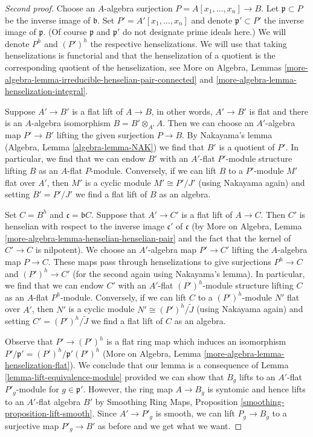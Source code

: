 \begin{proof}[Second proof]
Choose an $A$-algebra surjection $P = A[x_1, \ldots, x_n] \to B$.
Let $\mathfrak p \subset P$ be the inverse image of $\mathfrak b$.
Set $P' = A'[x_1, \ldots, x_n]$ and denote $\mathfrak p' \subset P'$
the inverse image of $\mathfrak p$. (Of course $\mathfrak p$
and $\mathfrak p'$ do not designate prime ideals here.)
We will denote $P^h$ and $(P')^h$ the respective henselizations.
We will use that taking henselizations is functorial and that
the henselization of a quotient is the corresponding quotient
of the henselization, see
More on Algebra, Lemmas
\ref{more-algebra-lemma-irreducible-henselian-pair-connected} and
\ref{more-algebra-lemma-henselization-integral}.

\medskip\noindent
Suppose $A' \to B'$ is a flat lift of $A \to B$, in other words,
$A' \to B'$ is flat and there is an $A$-algebra isomorphism
$B = B' \otimes_{A'} A$. Then we can choose an $A'$-algebra map
$P' \to B'$ lifting the given surjection $P \to B$.
By Nakayama's lemma (Algebra, Lemma \ref{algebra-lemma-NAK})
we find that $B'$ is a quotient of $P'$. In particular, we find
that we can endow $B'$ with an $A'$-flat $P'$-module structure
lifting $B$ as an $A$-flat $P$-module.
Conversely, if we can lift $B$ to a $P'$-module $M'$ flat over $A'$,
then $M'$ is a cyclic module $M' \cong P'/J'$ (using Nakayama again)
and setting $B' = P'/J'$ we find a flat lift of $B$ as an algebra.

\medskip\noindent
Set $C = B^h$ and $\mathfrak c = \mathfrak bC$.
Suppose that $A' \to C'$ is a flat lift of $A \to C$.
Then $C'$ is henselian with respect to the inverse image
$\mathfrak c'$ of $\mathfrak c$
(by More on Algebra, Lemma \ref{more-algebra-lemma-henselian-henselian-pair}
and the fact that the kernel of $C' \to C$ is nilpotent).
We choose an $A'$-algebra map $P' \to C'$ lifting
the $A$-algebra map $P \to C$. These maps pass through
henselizations to give surjections $P^h \to C$ and $(P')^h \to C'$
(for the second again using Nakayama's lemma).
In particular, we find that we can endow $C'$ with an $A'$-flat
$(P')^h$-module structure lifting $C$ as an $A$-flat $P^h$-module.
Conversely, if we can lift $C$ to a $(P')^h$-module $N'$ flat over $A'$,
then $N'$ is a cyclic module $N' \cong (P')^h/\tilde J$
(using Nakayama again) and setting $C' = (P')^h/\tilde J$
we find a flat lift of $C$ as an algebra.

\medskip\noindent
Observe that $P' \to (P')^h$ is a flat ring map which
induces an isomorphism $P'/\mathfrak p' = (P')^h/\mathfrak p'(P')^h$
(More on Algebra, Lemma \ref{more-algebra-lemma-henselization-flat}).
We conclude that our lemma is a consequence of
Lemma \ref{lemma-lift-equivalence-module} provided we can
show that $B_g$ lifts to an $A'$-flat $P'_g$-module for
$g \in \mathfrak p'$. However, the ring map $A \to B_g$ is syntomic
and hence lifts to an $A'$-flat algebra $B'$ by
Smoothing Ring Maps, Proposition \ref{smoothing-proposition-lift-smooth}.
Since $A' \to P'_g$ is smooth, we can lift $P_g \to B_g$
to a surjective map $P'_g \to B'$ as before and we get what we want.
\end{proof}

